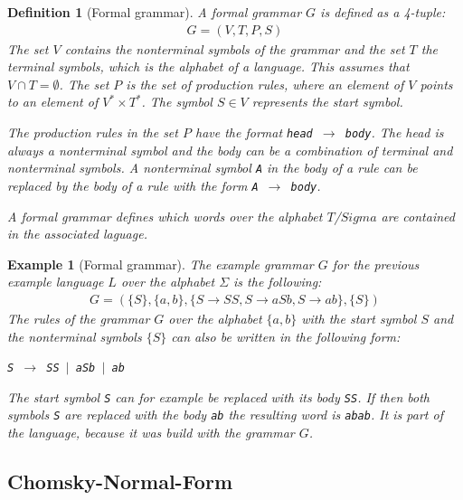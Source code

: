 \documentclass[a4paper, 11pt]{article}
\newtheorem*{example*}{Example}
\newtheorem*{definition*}{Definition}
\begin{document}
\begin{definition*}[Formal grammar]
A formal grammar $G$ is defined as a 4-tuple:
\begin{align*}
G = (V, T, P, S)
\end{align*}
The set $V$ contains the nonterminal symbols of the grammar and the set $T$ the terminal symbols, which is the alphabet of a language. This assumes that $V \cap T = \emptyset$. The set $P$ is the set of production rules, where an element of $V$ points to an element of $V^* \times T^*$. The symbol $S \in V$ represents the start symbol. 

The production rules in the set $P$ have the format \texttt{head $\rightarrow$ body}. The head is always a nonterminal symbol and the body can be a combination of terminal and nonterminal symbols. A nonterminal symbol \texttt{A} in the body of a rule can be replaced by the body of a rule with the form \texttt{A $\rightarrow$ body}.
\cite{LS_Ulm}

A formal grammar defines which words over the alphabet $T$/$Sigma$ are contained in the associated laguage.
\end{definition*}

\begin{example*}[Formal grammar]
The example grammar $G$ for the previous example language $L$ over the alphabet $\Sigma$ is the following:
\begin{align*}
G = (\{S\}, \{ a, b \}, \{ S \rightarrow SS, S \rightarrow  aSb, S \rightarrow ab \},  \{ S \})
\end{align*}
The rules of the grammar $G$ over the alphabet $\{a, b\}$ with the start symbol $S$ and the nonterminal symbols $\{ S \}$ can also be written in the following form:
\begin{center}
\texttt{S $\rightarrow$ SS $\mid$  aSb $\mid$ ab}
\end{center}
The start symbol \texttt{S} can for example be replaced with its body \texttt{SS}. If then both symbols \texttt{S} are replaced with the body \texttt{ab} the resulting word is \texttt{abab}. It is part of the language, because it was build with the grammar $G$.
\end{example*}


\subsection{Chomsky-Normal-Form}
\label{cnf}
\end{document}

